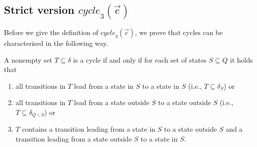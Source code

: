 \documentclass[a4paper,UKenglish,cleveref, autoref, thm-restate]{lipics-v2021}
\newcommand{\mcycle}{\mathit{cycle}}
\begin{document}
\subsection{Strict version $\mcycle_3(\vec{e})$}
Before we give the definition of $\mcycle_3(\vec{e})$, we prove that
cycles can be characterised in the following way.
\begin{lemma}
  A nonempty set $T\subseteq\delta$ is a cycle if and only if for each set of
  states $S\subseteq Q$ it holds that
  \begin{enumerate}
  \item\label{en:1} all transitions in $T$ lead from a state in $S$ to a state in $S$ (i.e., $T\subseteq\delta_S$) or
  \item\label{en:2} all transitions in $T$ lead from a state outside $S$ to a state outside $S$ (i.e., $T\subseteq\delta_{Q\smallsetminus S}$) or
  \item\label{en:3} $T$ contains a transition leading from a state in $S$ to a state outside $S$ and a transition leading from a state outside
    $S$ to a state in $S$.
  \end{enumerate}
\end{lemma}
\end{document}
